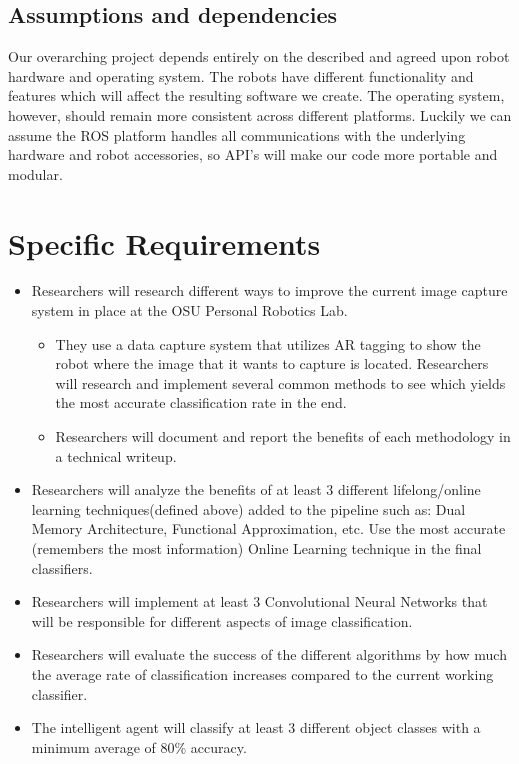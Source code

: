 \documentclass[draftclsnofoot, onecolumn, 10pt, compsoc]{IEEEtran}
\begin{document}
\subsection{Assumptions and dependencies}
Our overarching project depends entirely on the described and agreed upon robot hardware and operating system. The robots have different functionality and features which will affect the resulting software we create. The operating system, however, should remain more consistent across different platforms. Luckily we can assume the ROS platform handles all communications with the underlying hardware and robot accessories, so API's will make our code more portable and modular. 

\section{Specific Requirements}
\begin{itemize}
         \item Researchers will research different ways to improve the current image capture system in place at the OSU Personal Robotics Lab. 
         \begin{itemize}
         	\item They use a data capture system that utilizes AR tagging to show the robot where the image that it wants to capture is located. Researchers will research and implement several common methods to see which yields the most accurate classification rate in the end. 
            \item Researchers will document and report the benefits of each methodology in a technical writeup.
         \end{itemize}
         
         
         \item Researchers will analyze the benefits of at least 3 different lifelong/online learning techniques(defined above) added to the pipeline such as: Dual Memory Architecture, Functional Approximation, etc. Use the most accurate (remembers the most information) Online Learning technique in the final classifiers.
         \item Researchers will implement at least 3 Convolutional Neural Networks that will be responsible for different aspects of image classification. 
                  \item Researchers will evaluate the success of the different algorithms by how much the average rate of classification increases compared to the current working classifier.
         \item The intelligent agent will classify at least 3 different object classes with a minimum average of 80\% accuracy. 

    \end{itemize} 	
\end{document}
